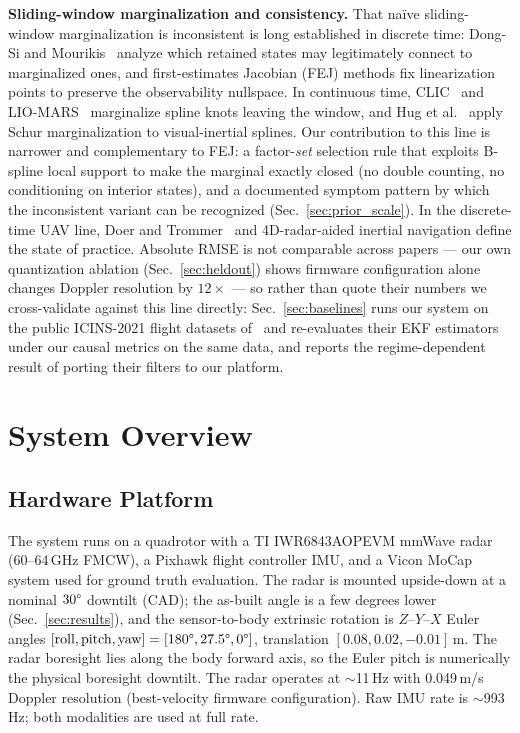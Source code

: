 \documentclass[conference]{IEEEtran}
\begin{document}
\textbf{Sliding-window marginalization and consistency.}
That na\"ive sliding-window marginalization is inconsistent is long
established in discrete time: Dong-Si and
Mourikis~\cite{dongsi2012consistency} analyze which retained states
may legitimately connect to marginalized ones, and first-estimates
Jacobian (FEJ) methods fix linearization points to preserve the
observability nullspace.  In continuous time,
CLIC~\cite{lv2023clic} and
LIO-MARS~\cite{quenzel2025liomars} marginalize spline knots leaving
the window, and Hug et al.~\cite{hug2022continuous} apply Schur
marginalization to visual-inertial splines.  Our contribution to this
line is narrower and complementary to FEJ: a factor-\emph{set}
selection rule that exploits B-spline local support to make the
marginal exactly closed (no double counting, no conditioning on
interior states), and a documented symptom pattern by which the
inconsistent variant can be recognized (Sec.~\ref{sec:prior_scale}).
In the discrete-time UAV line, Doer and
Trommer~\cite{doer2020ekf} and 4D-radar-aided inertial
navigation define the state of practice.
Absolute RMSE is not comparable across papers --- our own quantization
ablation (Sec.~\ref{sec:heldout}) shows firmware configuration alone
changes Doppler resolution by $12\times$ --- so rather than quote their
numbers we cross-validate against this line directly: Sec.~\ref{sec:baselines} runs our system on the
public ICINS-2021 flight datasets of~\cite{doer2021yrio} and re-evaluates
their EKF estimators under our causal metrics on the same data, and
reports the regime-dependent result of porting their filters to our
platform.

\section{System Overview}
\label{sec:overview}

\subsection{Hardware Platform}
The system runs on a quadrotor with a TI IWR6843AOPEVM
mmWave radar (60--64\,GHz FMCW), a Pixhawk flight
controller IMU, and a Vicon MoCap system used for ground
truth evaluation.  The radar is mounted upside-down at a nominal $30\degree$ downtilt (CAD);
the as-built angle is a few degrees lower (Sec.~\ref{sec:results}), and
the sensor-to-body extrinsic rotation is $Z$--$Y$--$X$ Euler angles
$[\text{roll},\text{pitch},\text{yaw}] = [180\degree, 27.5\degree,
0\degree]$, translation $[0.08, 0.02, -0.01]$\,m.  The radar boresight
lies along the body forward axis, so the Euler pitch is numerically the
physical boresight downtilt.  The radar operates at $\sim$11\,Hz with 0.049\,m/s Doppler
resolution (best-velocity firmware configuration).  Raw IMU rate
is $\sim$993\,Hz; both modalities are used at full rate.
\end{document}

